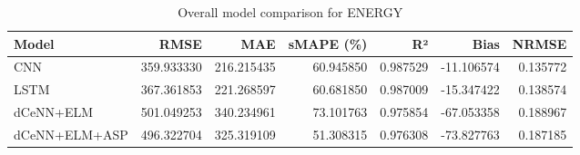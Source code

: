 \begin{table}
\caption{Overall model comparison for ENERGY}
\begin{tabular}{lrrrrrr}
\toprule
Model & RMSE & MAE & sMAPE (\%) & R² & Bias & NRMSE \\
\midrule
CNN & 359.933330 & 216.215435 & 60.945850 & 0.987529 & -11.106574 & 0.135772 \\
LSTM & 367.361853 & 221.268597 & 60.681850 & 0.987009 & -15.347422 & 0.138574 \\
dCeNN+ELM & 501.049253 & 340.234961 & 73.101763 & 0.975854 & -67.053358 & 0.188967 \\
dCeNN+ELM+ASP & 496.322704 & 325.319109 & 51.308315 & 0.976308 & -73.827763 & 0.187185 \\
\bottomrule
\end{tabular}
\end{table}
